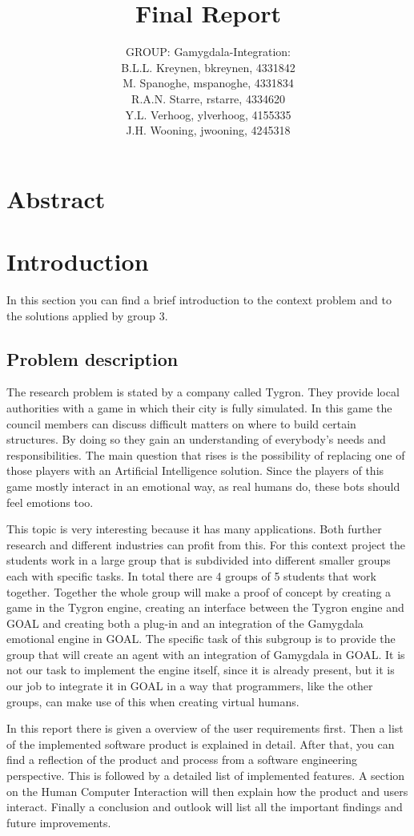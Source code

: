 \documentclass[11pt]{article}
\title{Final Report}
\author{GROUP: Gamygdala-Integration:\\
	B.L.L. Kreynen, bkreynen, 4331842\\
	M. Spanoghe, mspanoghe, 4331834\\
	R.A.N. Starre, rstarre, 4334620\\
	Y.L. Verhoog, ylverhoog, 4155335\\
	J.H. Wooning, jwooning, 4245318\\
}
\begin{document}
\maketitle
\pagebreak
\tableofcontents
\pagebreak
\section{Abstract}

\clearpage

\section{Introduction}
In this section you can find a brief introduction to the context problem and to the solutions applied by group 3. 
\subsection{Problem description}
The research problem is stated by a company called Tygron. They provide local authorities with a game in which their city is fully simulated. In this game the council members can discuss difficult matters on where to build certain structures. By doing so they gain an understanding of everybody's needs and responsibilities. The main question that rises is the possibility of replacing one of those players with an Artificial Intelligence solution. Since the players of this game mostly interact in an emotional way, as real humans do, these bots should feel emotions too.\par 
This topic is very interesting because it has many applications. Both further research and different industries can profit from this. For this context project the students work in a large group that is subdivided into different smaller groups each with specific tasks. In total there are 4 groups of 5 students that work together. Together the whole group will make a proof of concept by creating a game in the Tygron engine\cite{Tygron}, creating an interface between the Tygron engine and \gls{GOAL} and creating both a plug-in and an integration of the \gls{Gamygdala} emotional engine in GOAL. The specific task of this subgroup is to provide the group that will create an agent with an integration of Gamygdala in GOAL. It is not our task to implement the engine itself, since it is already present, but it is our job to integrate it in GOAL in a way that programmers, like the other groups, can make use of this when creating virtual humans.\par 
In this report there is given a overview of the user requirements first. Then a list of the implemented software product is explained in detail. After that, you can find a reflection of the product and process from a software engineering perspective. This is followed by a detailed list of implemented features. A section on the Human Computer Interaction will then explain how the product and users interact. Finally a conclusion and outlook will list all the important findings and future improvements.
\\
\end{document}
